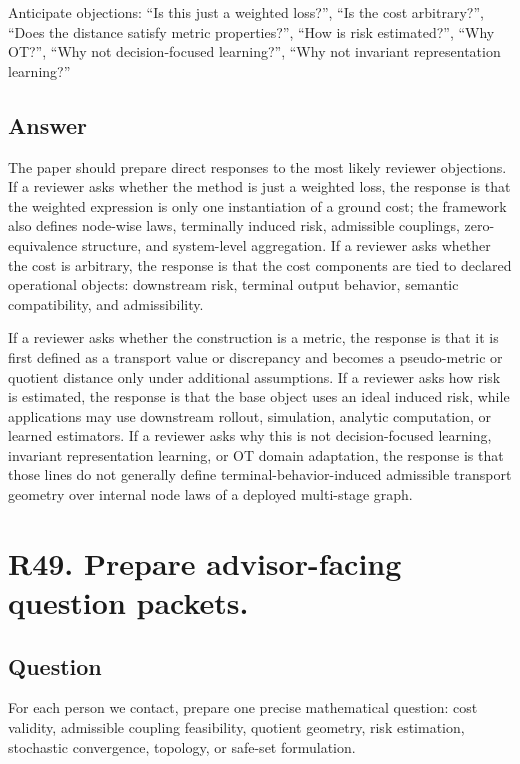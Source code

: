 \documentclass[11pt,a4paper]{article}
\begin{document}
Anticipate objections: ``Is this just a weighted loss?'', ``Is the cost arbitrary?'', ``Does the distance satisfy metric properties?'', ``How is risk estimated?'', ``Why OT?'', ``Why not decision-focused learning?'', ``Why not invariant representation learning?''

\subsection*{Answer}

The paper should prepare direct responses to the most likely reviewer objections. If a reviewer asks whether the method is just a weighted loss, the response is that the weighted expression is only one instantiation of a ground cost; the framework also defines node-wise laws, terminally induced risk, admissible couplings, zero-equivalence structure, and system-level aggregation. If a reviewer asks whether the cost is arbitrary, the response is that the cost components are tied to declared operational objects: downstream risk, terminal output behavior, semantic compatibility, and admissibility.

If a reviewer asks whether the construction is a metric, the response is that it is first defined as a transport value or discrepancy and becomes a pseudo-metric or quotient distance only under additional assumptions. If a reviewer asks how risk is estimated, the response is that the base object uses an ideal induced risk, while applications may use downstream rollout, simulation, analytic computation, or learned estimators. If a reviewer asks why this is not decision-focused learning, invariant representation learning, or OT domain adaptation, the response is that those lines do not generally define terminal-behavior-induced admissible transport geometry over internal node laws of a deployed multi-stage graph.

\section*{R49. Prepare advisor-facing question packets.}

\subsection*{Question}

For each person we contact, prepare one precise mathematical question: cost validity, admissible coupling feasibility, quotient geometry, risk estimation, stochastic convergence, topology, or safe-set formulation.
\end{document}
